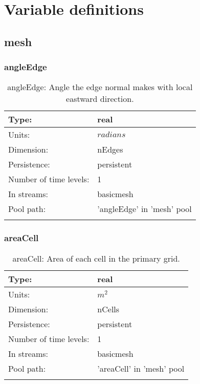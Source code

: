 \chapter[Variable definitions]{Variable definitions}
\label{chap:variable_sections}
\section[mesh]{mesh}
\label{sec:var_sec_mesh}
\subsection[angleEdge]{angleEdge}
\label{subsec:var_sec_mesh_angleEdge}
\begin{center}
\begin{longtable}{| p{2.0in} | p{4.0in} |}
        \hline 
        Type: & real \\
        \hline 
        Units: & $radians$ \\
        \hline 
        Dimension: & nEdges \\
        \hline 
        Persistence: & persistent \\
        \hline 
        Number of time levels: & 1 \\
        \hline 
		 In streams: &  basicmesh \\
        \hline 
            Pool path: & 'angleEdge' in 'mesh' pool
 \\
		 \hline 
    \caption{angleEdge: Angle the edge normal makes with local eastward direction.}
\end{longtable}
\end{center}
\subsection[areaCell]{areaCell}
\label{subsec:var_sec_mesh_areaCell}
\begin{center}
\begin{longtable}{| p{2.0in} | p{4.0in} |}
        \hline 
        Type: & real \\
        \hline 
        Units: & $m^2$ \\
        \hline 
        Dimension: & nCells \\
        \hline 
        Persistence: & persistent \\
        \hline 
        Number of time levels: & 1 \\
        \hline 
		 In streams: &  basicmesh \\
        \hline 
            Pool path: & 'areaCell' in 'mesh' pool
 \\
		 \hline 
    \caption{areaCell: Area of each cell in the primary grid.}
\end{longtable}
\end{center}
